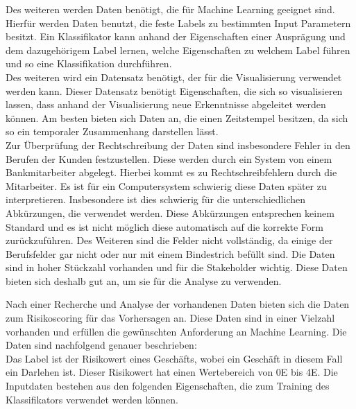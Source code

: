 Des weiteren werden Daten benötigt, die für Machine Learning geeignet sind. 
Hierfür werden Daten benutzt, die feste Labels zu bestimmten Input Parametern besitzt.
Ein Klassifikator kann anhand der Eigenschaften einer Ausprägung und dem dazugehörigem Label lernen, welche Eigenschaften zu welchem Label führen und so eine Klassifikation durchführen. \\

Des weiteren wird ein Datensatz benötigt, der für die Visualisierung verwendet werden kann. 
Dieser Datensatz benötigt Eigenschaften, die sich so visualisieren lassen, dass anhand der Visualisierung neue Erkenntnisse abgeleitet werden können.
Am besten bieten sich Daten an, die einen Zeitstempel besitzen, da sich so ein temporaler Zusammenhang darstellen lässt. \cite{pastorello2014}
\\





Zur Überprüfung der Rechtschreibung der Daten sind insbesondere Fehler in den Berufen der Kunden festzustellen. 
Diese werden durch ein System von einem Bankmitarbeiter abgelegt. 
Hierbei kommt es zu Rechtschreibfehlern durch die Mitarbeiter. 
Es ist für ein Computersystem schwierig diese Daten später zu interpretieren.
Insbesondere ist dies schwierig für die unterschiedlichen Abkürzungen, die verwendet werden. 
Diese Abkürzungen entsprechen keinem Standard und es ist nicht möglich diese automatisch auf die korrekte Form zurückzuführen. 
Des Weiteren sind die Felder nicht vollständig, da einige der Berufsfelder gar nicht oder nur mit einem Bindestrich befüllt sind. 
Die Daten sind in hoher Stückzahl vorhanden und für die Stakeholder wichtig. 
Diese Daten bieten sich deshalb gut an, um sie für die Analyse zu verwenden. 


Nach einer Recherche und Analyse der vorhandenen Daten bieten sich die Daten zum Risikoscoring für das Vorhersagen an.
Diese Daten sind in einer Vielzahl vorhanden und erfüllen die gewünschten Anforderung an Machine Learning. 
Die Daten sind nachfolgend genauer beschrieben: \\
Das Label ist der Risikowert eines Geschäfts, wobei ein Geschäft in diesem Fall ein Darlehen ist.
Dieser Risikowert hat einen Wertebereich von 0E bis 4E.
Die Inputdaten bestehen aus den folgenden Eigenschaften, die zum Training des Klassifikators verwendet werden können. 







